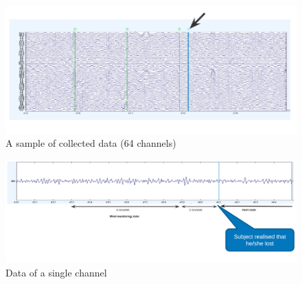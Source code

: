 

 
 \begin{figure}
    \centering
    \includegraphics[width=15cm]{Pictures/data_sample.png}
    \caption{A sample of collected data (64 channels) }
    \label{fig:data_sample}
\end{figure}

 \begin{figure}
    \centering
    \includegraphics[width=15cm]{Pictures/single_chanel_data.png}
    \caption{Data of a single channel }
    \label{fig:single_chanel_data}
\end{figure}
